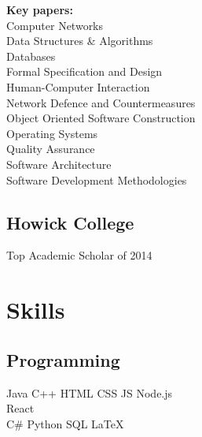 \documentclass[letterpaper]{deedy-resume} %
\begin{document}
\begin{minipage}[t]{0.325\textwidth}
\textbf{Key papers:} \\
\vspace{0.1em}
Computer Networks \\
Data Structures \& Algorithms \\
Databases \\
Formal Specification and Design \\
Human-Computer Interaction \\
Network Defence and Countermeasures \\
Object Oriented Software Construction \\
Operating Systems \\
Quality Assurance \\
Software Architecture \\
Software Development Methodologies \\



\sectionspace %


\subsection{Howick College}

Top Academic Scholar of 2014

\sectionspace %


\section{Skills}

\subsection{Programming}

Java \textbullet{} C++ \textbullet{} HTML \textbullet{} CSS \textbullet{} JS \textbullet{} Node.js \\ React\\ 
C\# \textbullet{} Python \textbullet{} SQL \textbullet{} \LaTeX\\


\end{minipage}
\end{document}
